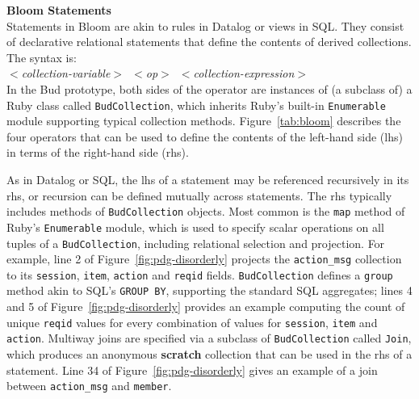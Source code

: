\textbf{Bloom Statements}\\
\noindent
Statements in Bloom are akin to rules in Datalog or views in SQL.  They consist of declarative relational statements that define the contents of derived collections.  The syntax is:\\
\noindent
\mbox{\hspace{0.25in}\emph{$<$collection-variable$>$ $<$op$>$ $<$collection-expression$>$}}\\
\noindent
In the Bud prototype, both sides of the operator are instances of (a subclass of) a Ruby class called \texttt{BudCollection}, which inherits Ruby's built-in \texttt{Enumerable} module supporting typical collection methods.  Figure~\ref{tab:bloom} describes the four operators that can be used to define the contents of the left-hand side (lhs) in terms of the right-hand side (rhs).

As in Datalog or SQL, the lhs of a statement may be referenced recursively in its rhs, or recursion can be defined mutually across statements.  The rhs typically includes methods of \texttt{BudCollection} objects.  
Most common is the \texttt{map} method of Ruby's \texttt{Enumerable} module, which is used to specify scalar operations on all tuples of a \texttt{BudCollection}, including relational selection and projection. For example, line 2 of Figure~\ref{fig:pdg-disorderly} projects the \texttt{action\_msg} collection to its \texttt{session}, \texttt{item}, \texttt{action} and \texttt{reqid} fields.  \texttt{BudCollection} defines a \texttt{group} method akin to SQL's \texttt{GROUP BY}, supporting the standard SQL aggregates; lines 4 and 5 of Figure~\ref{fig:pdg-disorderly} 
provides an example computing the count 
of unique \texttt{reqid} values for every combination of values for \texttt{session}, 
\texttt{item} and \texttt{action}.
Multiway joins are specified via a subclass of \texttt{BudCollection} called \texttt{Join}, which produces an anonymous \textbf{scratch} collection that can be used in the rhs of a statement. 
Line 34 of Figure~\ref{fig:pdg-disorderly} gives an example of a join between
\texttt{action\_msg} and \texttt{member}.



